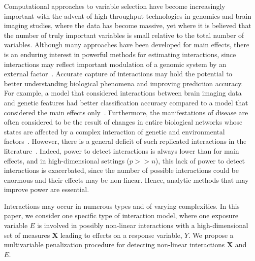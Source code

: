 \documentclass[12pt,letter]{article}\usepackage[]{graphicx}\usepackage[]{color}
\newcommand{\mb}[1]{\mathbf{#1}}
\begin{document}
Computational approaches to variable selection have become increasingly important with the advent of high-throughput technologies in genomics and brain imaging studies, where the data has become massive, yet where it is believed that the number of truly important variables is small relative to the total number of variables.
Although many approaches have been developed for main effects, there is an enduring interest in powerful methods for estimating interactions, since interactions may reflect important modulation of a genomic system by an external factor~\citep{bhatnagar2018analytic}.
Accurate capture of interactions may hold the potential to better understanding  biological phenomena and improving prediction accuracy.
For example, a model that considered interactions between brain imaging data and genetic features had better classification accuracy compared to a model that considered the main effects only~\citep{ning2018classifying}.
Furthermore, the manifestations of disease are often considered to be the result of changes in entire biological networks whose states are affected by a complex interaction of genetic and environmental factors~\citep{schadt2009molecular}.
However, there is a general deficit of such replicated interactions in the literature~\citep{timpson2018genetic}.
Indeed, power to detect interactions is always lower than for  main effects, and in high-dimensional settings ($p >> n$), this lack of power to detect interactions is exacerbated, since the number of possible interactions could be enormous and their effects may be non-linear. 
Hence, analytic methods that may improve power are essential.

Interactions may occur in numerous types and of varying complexities. 
In this paper, we consider one specific type of interaction model, where one exposure variable $E$ is involved in possibly non-linear interactions with a high-dimensional set of measures $\mb{X}$ leading to effects on a response variable, $Y$. We propose a multivariable penalization procedure for detecting non-linear interactions $\mb{X}$ and $E$.
\end{document}
